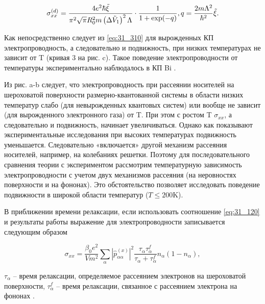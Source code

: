 \begin{equation} \label{eq:31_310}
\sigma _{xx}^{(d)} =\frac{4e^{2} \hbar \tilde{\xi }}{\pi ^{2} \sqrt{\pi } R_{0}^{2} m\left(\Delta \tilde{V}_{1} \right)^{2} \Lambda } \cdot \frac{{\rm 1}}{1+{\exp}(-q)} , q=\frac{2m\Lambda ^{2} }{\hbar ^{2} } \tilde{\xi }.  
\end{equation}

Как непосредственно следует из \eqref{eq:31_310} для вырожденных КП электропроводность, а следовательно и подвижность, при низких температурах не зависит от T (кривая 3 на рис. c). Такое поведение электропроводности от температуры экспериментально наблюдалось в КП Bi \cite{Lin2000,Heremans1998,Zhang2000,Heremans2000,Gitsu2003,Nikolaeva2006,Gitsu2005}.

Из рис. a-b следует, что электропроводность при рассеянии носителей на шероховатой поверхности размерно-квантованной системы в области низких температур слабо (для невырожденных квантовых систем) или вообще не зависит (для вырожденного электронного газа) от T. При этом с ростом T $\sigma _{xx} $, а следовательно и подвижность, начинает увеличиваться. Однако как показывают экспериментальные исследования \cite{Zhang2000,Gitsu2003,Nikolaeva2006} при высоких температурах подвижность уменьшается. Следовательно «включается» другой механизм рассеяния носителей, например, на колебаниях решетки. Поэтому для последовательного сравнения теории с экспериментом рассмотрим температурную зависимость электропроводности с учетом двух механизмов рассеяния (на неровностях поверхности и на фононах). Это обстоятельство позволяет исследовать поведение подвижности в широкой области температур ($T\le 200\text{K}$).

В приближении времени релаксации, если использовать соотношение \eqref{eq:31_120} и результаты работы \cite{Khamidullin2002} выражение для электропроводности записывается следующим образом

\begin{equation} \label{eq:31_320}
\sigma _{xx} =\frac{\beta _{0} e^{2} }{Vm^{2} } \sum _{\alpha }\left|\hat{p}_{\alpha \alpha _{} }^{(x)} \right|^{2} \frac{\tau _{\alpha } \tau _{\alpha }^{f} }{\tau _{\alpha } +\tau _{\alpha }^{f} } n_{\alpha } \left(1-n_{\alpha } \right),
\end{equation}

\noindent $\tau _{\alpha } $ -- время релаксации, определяемое рассеянием электронов на шероховатой поверхности, $\tau _{\alpha }^{f} $ -- время релаксации, связанное с рассеянием электрона на фононах \cite{Khamidullin2002}.

